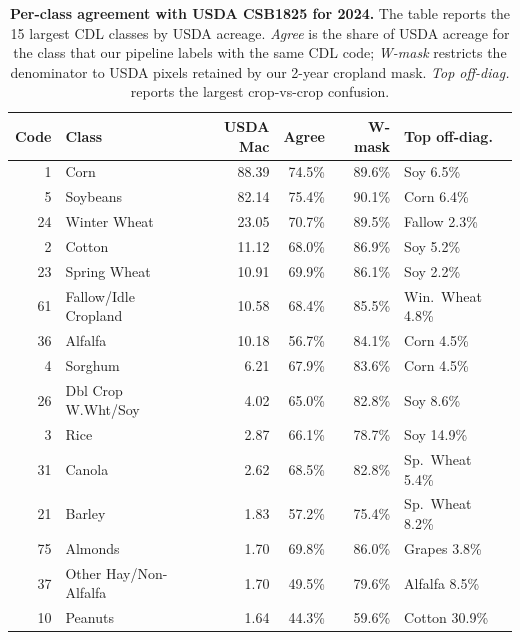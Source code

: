 \documentclass[preprint,12pt]{elsarticle}
\begin{document}
\begin{table}[t]
\centering
\caption{\textbf{Per-class agreement with USDA CSB1825 for 2024.} The table
reports the 15 largest CDL classes by USDA acreage.
\emph{Agree} is the share of USDA acreage for the class that our
pipeline labels with the same CDL code; \emph{W-mask} restricts the
denominator to USDA pixels retained by our 2-year cropland mask.
\emph{Top off-diag.} reports the largest crop-vs-crop confusion.}
\label{tab:per-class}
\small
\setlength{\tabcolsep}{4pt}
\begin{tabular}{@{}rlrrrl@{}}
\toprule
Code & Class & USDA Mac & Agree & W-mask & Top off-diag. \\
\midrule
  1 & Corn                      & 88.39 & 74.5\% & 89.6\% & Soy 6.5\%        \\
  5 & Soybeans                  & 82.14 & 75.4\% & 90.1\% & Corn 6.4\%       \\
 24 & Winter Wheat              & 23.05 & 70.7\% & 89.5\% & Fallow 2.3\%     \\
  2 & Cotton                    & 11.12 & 68.0\% & 86.9\% & Soy 5.2\%        \\
 23 & Spring Wheat              & 10.91 & 69.9\% & 86.1\% & Soy 2.2\%        \\
 61 & Fallow/Idle Cropland      & 10.58 & 68.4\% & 85.5\% & Win.\ Wheat 4.8\%\\
 36 & Alfalfa                   & 10.18 & 56.7\% & 84.1\% & Corn 4.5\%       \\
  4 & Sorghum                   &  6.21 & 67.9\% & 83.6\% & Corn 4.5\%       \\
 26 & Dbl Crop W.Wht/Soy        &  4.02 & 65.0\% & 82.8\% & Soy 8.6\%        \\
  3 & Rice                      &  2.87 & 66.1\% & 78.7\% & Soy 14.9\%       \\
 31 & Canola                    &  2.62 & 68.5\% & 82.8\% & Sp.\ Wheat 5.4\% \\
 21 & Barley                    &  1.83 & 57.2\% & 75.4\% & Sp.\ Wheat 8.2\% \\
 75 & Almonds                   &  1.70 & 69.8\% & 86.0\% & Grapes 3.8\%     \\
 37 & Other Hay/Non-Alfalfa     &  1.70 & 49.5\% & 79.6\% & Alfalfa 8.5\%    \\
 10 & Peanuts                   &  1.64 & 44.3\% & 59.6\% & Cotton 30.9\%    \\
\bottomrule
\end{tabular}
\end{table}
\end{document}
